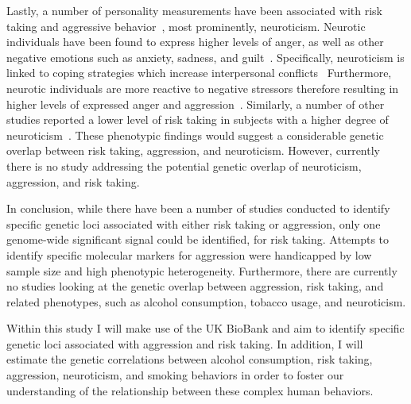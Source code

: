 Lastly, a number of personality measurements have been associated with risk taking and aggressive behavior~\cite{Anderson2002a},
most prominently, neuroticism.
Neurotic individuals have been found to express higher levels of anger, as well as other negative emotions such as anxiety, sadness, and guilt~\cite{Watson1984}.
Specifically, neuroticism is linked to coping strategies which increase interpersonal conflicts~\cite{Bolger1991,Ode2008}
Furthermore, neurotic individuals are more reactive to negative stressors therefore resulting in higher levels of expressed anger and aggression~\cite{Ode2008}.
Similarly, a number of other studies reported a lower level of risk taking in subjects with a higher degree of neuroticism~\cite{Lauriola2001,InstituteofMedicine2011,Paulus2003}.
These phenotypic findings would suggest a considerable genetic overlap between risk taking, aggression, and neuroticism.
However, currently there is no study addressing the potential genetic overlap of neuroticism, aggression, and risk taking.

In conclusion, while there have been a number of studies conducted to identify specific genetic loci associated  with either risk taking or aggression, only one genome-wide significant signal could be identified, for risk taking.
Attempts to identify specific molecular markers for aggression were handicapped by low sample size and high phenotypic heterogeneity.
Furthermore, there are currently no studies looking at the genetic overlap between aggression, risk taking, and related phenotypes, such as alcohol consumption, tobacco usage, and neuroticism.

Within this study I will make use of the UK BioBank and aim to identify specific genetic loci associated with aggression and risk taking.
In addition, I will estimate the genetic correlations between alcohol consumption, risk taking, aggression, neuroticism, and smoking behaviors in order to foster our understanding of the relationship between these complex human behaviors.

